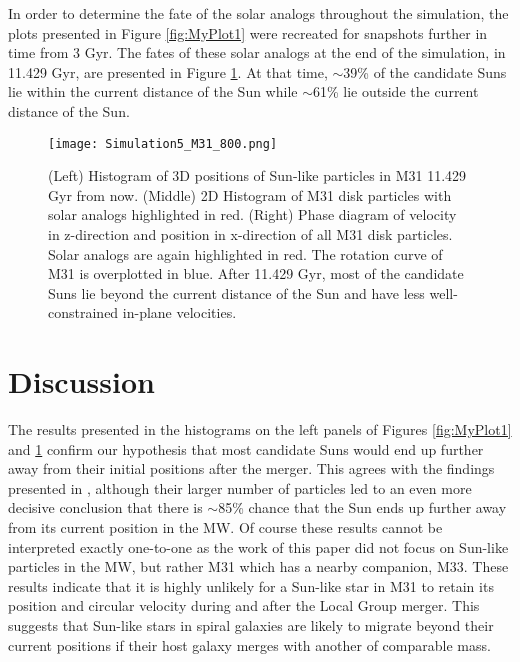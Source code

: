 \documentclass{aastex63}
\begin{document}
In order to determine the fate of the solar analogs throughout the simulation, the plots presented in Figure \ref{fig:MyPlot1} were recreated for snapshots further in time from 3 Gyr. The fates of these solar analogs at the end of the simulation, in 11.429 Gyr, are presented in Figure \ref{fig:MyPlot2}. At that time, $\sim$39\% of the candidate Suns lie within the current distance of the Sun while $\sim$61\% lie outside the current distance of the Sun.

\begin{figure}[h!]
    \centering
    \texttt{[image: Simulation5\_M31\_800.png]}
    \caption{(Left) Histogram of 3D positions of Sun-like particles in M31 11.429 Gyr from now. (Middle) 2D Histogram of M31 disk particles with solar analogs highlighted in red. (Right) Phase diagram of velocity in z-direction and position in x-direction of all M31 disk particles. Solar analogs are again highlighted in red. The rotation curve of M31 is overplotted in blue. After 11.429 Gyr, most of the candidate Suns lie beyond the current distance of the Sun and have less well-constrained in-plane velocities.}
    \label{fig:MyPlot2}
\end{figure}

\section{Discussion}
The results presented in the histograms on the left panels of Figures \ref{fig:MyPlot1} and \ref{fig:MyPlot2} confirm our hypothesis that most candidate Suns would end up further away from their initial positions after the merger. This agrees with the findings presented in \cite{2012ApJ...753....9V}, although their larger number of particles led to an even more decisive conclusion that there is $\sim$85\% chance that the Sun ends up further away from its current position in the MW. Of course these results cannot be interpreted exactly one-to-one as the work of this paper did not focus on Sun-like particles in the MW, but rather M31 which has a nearby companion, M33. These results indicate that it is highly unlikely for a Sun-like star in M31 to retain its position and circular velocity during and after the Local Group merger. This suggests that Sun-like stars in spiral galaxies are likely to migrate beyond their current positions if their host galaxy merges with another of comparable mass.
\end{document}
